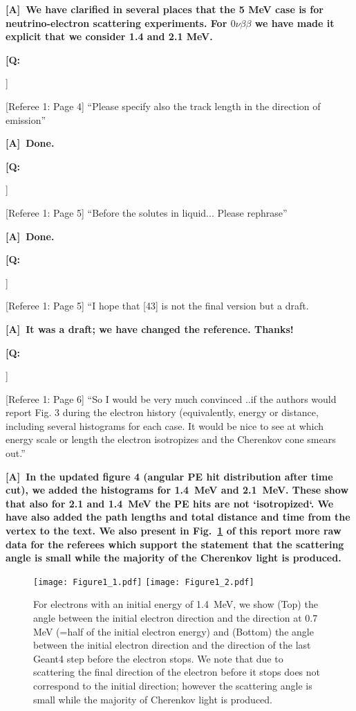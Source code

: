 \documentclass[11pt]{article}
\newcounter{question}
\newcommand{\noteq}{{\vskip0.1in\bf \large \color{red} [Q:{\color{black}\addtocounter{question}{1}\arabic{question}}]~}}
\newcommand{\notea}{{\bf \large \color{red} [A]~}}
\def \D    {Done.}
\begin{document}
\notea{\bf We have clarified in several places 
that the 5 MeV case is for neutrino-electron scattering experiments. For $0\nu\beta\beta$ we
have made it explicit that we consider 1.4 and 2.1 MeV.}\\


\noteq [Referee 1: Page 4] ``Please specify also the track length in
the direction of emission''

\notea{\bf \D}\\


\noteq [Referee 1: Page 5] ``Before the solutes in liquid... Please rephrase'' 

\notea{\bf \D}\\

\noteq [Referee 1: Page 5] ``I hope that [43] is not the final version
but a draft. 

\notea{\bf It was a draft; we have changed the reference. Thanks!}\\


\noteq [Referee 1: Page 6] ``So I would be very much convinced ..if
the authors would report Fig. 3 during the electron history
(equivalently, energy or distance, including several histograms for
each case. It would be nice to see at which energy scale or length the
electron isotropizes and the Cherenkov cone smears out.''

\notea{\bf  In the updated figure 4 (angular PE hit distribution after time cut), we added the histograms for 1.4~MeV and 2.1~MeV. These show that also for 2.1 and 1.4~MeV the PE hits are not `isotropized`.%
We have also added the path lengths and total distance and time from the vertex to the text. We also present in Fig.~\ref{truthscatt} of this report  more raw data for the referees which support the statement that the scattering angle is small while the majority of the Cherenkov light is produced.}\\ 

\begin{figure}
        \begin{center}
        \texttt{[image: Figure1\_1.pdf]} 
        \texttt{[image: Figure1\_2.pdf]} 
	   \caption[]{For electrons with an initial energy of 1.4~MeV, we show (Top) the angle between the initial electron direction and the direction at 0.7 MeV (=half of the initial electron energy) and (Bottom) the angle between the initial electron direction and the direction of the last Geant4 step before the electron stops. We note that due to scattering the final direction of the electron before it stops does not correspond to the initial direction; however the scattering angle is small while the majority of Cherenkov light is produced.}
	  \label{truthscatt}
        \end{center}
\end{figure}
\end{document}
